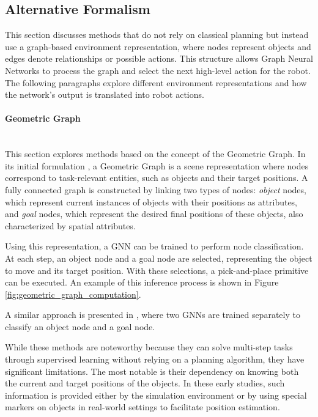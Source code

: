 \subsection{Alternative Formalism}
\label{sec:gnn_alternative_formalism}

This section discusses methods that do not rely on classical planning but instead use a graph-based environment representation, where nodes represent objects and edges denote relationships or possible actions. This structure allows Graph Neural Networks to process the graph and select the next high-level action for the robot. The following paragraphs explore different environment representations and how the network's output is translated into robot actions.

\paragraph*{Geometric Graph} \mbox{}\\
This section explores methods based on the concept of the Geometric Graph. In its initial formulation \cite{lin2022efficient}, a Geometric Graph is a scene representation where nodes correspond to task-relevant entities, such as objects and their target positions. A fully connected graph is constructed by linking two types of nodes: \textit{object} nodes, which represent current instances of objects with their positions as attributes, and \textit{goal} nodes, which represent the desired final positions of these objects, also characterized by spatial attributes.

Using this representation, a GNN can be trained to perform node classification. At each step, an object node and a goal node are selected, representing the object to move and its target position. With these selections, a pick-and-place primitive can be executed. An example of this inference process is shown in Figure \ref{fig:geometric_graph_computation}.


A similar approach is presented in \cite{di2023one}, where two GNNs are trained separately to classify an object node and a goal node.

While these methods are noteworthy because they can solve multi-step tasks through supervised learning without relying on a planning algorithm, they have significant limitations. The most notable is their dependency on knowing both the current and target positions of the objects. In these early studies, such information is provided either by the simulation environment or by using special markers on objects in real-world settings to facilitate position estimation.

